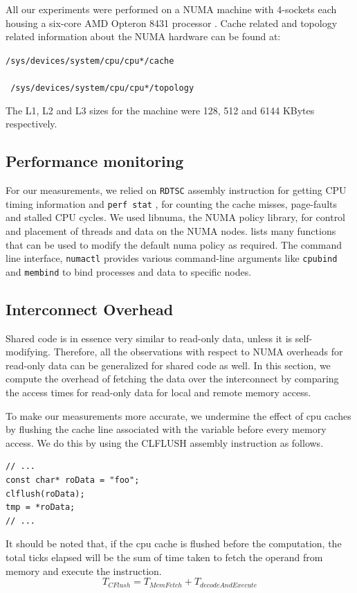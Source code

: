 
All our experiments were performed on a NUMA machine with 4-sockets each housing a six-core AMD Opteron 8431 processor \cite{opteron}.
Cache related and topology related information about the NUMA hardware can be found at:

\texttt{/sys/devices/system/cpu/cpu*/cache } \\
\\
\texttt{ /sys/devices/system/cpu/cpu*/topology }

The L1, L2 and L3 sizes for the machine were 128, 512 and 6144 KBytes respectively.

\subsection{Performance monitoring}
For our measurements, we relied on \texttt{RDTSC} assembly instruction\cite{timeStampCounter} for getting CPU timing information
and \texttt{perf stat} \cite{perfWiki}, for counting the cache misses, page-faults and stalled CPU cycles. We used libnuma,
the NUMA policy library, for control and placement of threads and data on the NUMA nodes. \cite{libNuma} lists many functions
that can be used to modify the default numa policy as required. The command line interface, \texttt{numactl} \cite{numactl} 
provides various command-line arguments like \texttt{cpubind} and \texttt{membind} to bind processes and data to specific nodes.

\subsection{Interconnect Overhead}
Shared code is in essence very similar to read-only data, unless it is self-modifying.
Therefore, all the observations with respect to NUMA overheads for read-only data can be generalized for shared code as well.
In this section, we compute the overhead of fetching the data over the interconnect by comparing the access times for read-only
data for local and remote memory access.

To make our measurements more accurate, we undermine the effect of cpu caches by flushing the cache line associated with the 
variable before every memory access. We do this by using the CLFLUSH\cite{clflush} assembly instruction as follows.
\begin{verbatim}
// ...
const char* roData = "foo";
clflush(roData);
tmp = *roData;
// ...
\end{verbatim}

It should be noted that, if the cpu cache is flushed before the computation, the total ticks elapsed will be the sum of time 
taken to fetch the operand from memory and execute the instruction.
\begin{dmath}
\label{eqn:NoCacheFetch}
T_{CFlush} = T_{MemFetch} + T_{decodeAndExecute}
\end{dmath}

